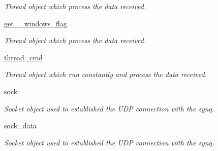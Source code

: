 \begin{DoxyCompactItemize}
\begin{DoxyCompactList}\small\item\em Thread object which process the data received. \end{DoxyCompactList}\item 
\mbox{\label{classwatchman_1_1_watchman__main__window_ad5fdd038b4c5784a0215f797e6d4f3d0}} 
\mbox{\hyperlink{classwatchman_1_1_watchman__main__window_ad5fdd038b4c5784a0215f797e6d4f3d0}{get\+\_\+\_\+windows\+\_\+flag}}
\begin{DoxyCompactList}\small\item\em Thread object which process the data received. \end{DoxyCompactList}\item 
\mbox{\label{classwatchman_1_1_watchman__main__window_ad85cee0f1a7151f5432e14c9035dcd08}} 
\mbox{\hyperlink{classwatchman_1_1_watchman__main__window_ad85cee0f1a7151f5432e14c9035dcd08}{thread\+\_\+cmd}}
\begin{DoxyCompactList}\small\item\em Thread object which run constantly and process the data received. \end{DoxyCompactList}\item 
\mbox{\label{classwatchman_1_1_watchman__main__window_a2915b2132c21f91032c59d8217412142}} 
\mbox{\hyperlink{classwatchman_1_1_watchman__main__window_a2915b2132c21f91032c59d8217412142}{sock}}
\begin{DoxyCompactList}\small\item\em Socket object used to established the U\+DP connection with the zynq. \end{DoxyCompactList}\item 
\mbox{\label{classwatchman_1_1_watchman__main__window_a4507da6084d3549ba483b43572a575fe}} 
\mbox{\hyperlink{classwatchman_1_1_watchman__main__window_a4507da6084d3549ba483b43572a575fe}{sock\+\_\+data}}
\begin{DoxyCompactList}\small\item\em Socket object used to established the U\+DP connection with the zynq. \end{DoxyCompactList}\item 
\mbox{\label{classwatchman_1_1_watchman__main__window_a69cda14568d01651d907a5e289e3ab99}} 

\end{DoxyCompactItemize}
